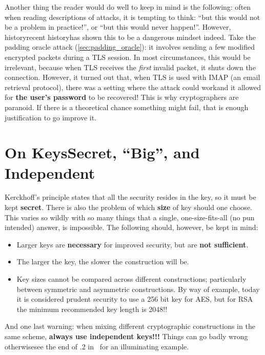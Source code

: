   \bigskip

   Another thing the reader would do well to keep in mind is the following: often when reading descriptions of attacks, it is tempting to think: ``but this would not be a problem in practice!'', or ``but this would never happen!''. However, history\emd recent history\emd has shown this to be a dangerous mindset indeed. Take the padding oracle attack (\ts\ref{sec:padding_oracle}): it involves sending a few modified encrypted packets during a TLS session. In most circumstances, this would be irrelevant, because when TLS receives the \emph{first} invalid packet, it shuts down the connection. However, it turned out that, when TLS is used with IMAP (an email retrieval protocol), there was a setting where the attack could work\emd and it allowed for \textbf{the user's password} to be recovered! This is why cryptographers are paranoid. If there is a theoretical chance something might fail, that is enough justification to go improve it.

\section{On Keys\emd Secret, ``Big'', and Independent}
  \label{sec:on_keys}
  Kerckhoff's principle states that all the security resides in the key, so it must be kept \textbf{secret}. There is also the problem of which \textbf{size} of key should one choose. This varies so wildly with so many things that a single, one-size-fits-all (no pun intended) answer, is impossible. The following should, however, be kept in mind:
  \begin{itemize}
    \item Larger keys are \textbf{necessary} for improved security, but are \textbf{not sufficient}.
    \item The larger the key, the slower the construction will be.
    \item Key sizes cannot be compared across different constructions; particularly between symmetric and asymmetric constructions. By way of example, today it is considered prudent security to use a 256 bit key for AES, but for RSA the minimum recommended key length is 2048!!
  \end{itemize}
  And one last warning: when mixing different cryptographic constructions in the same scheme, \textbf{always use independent keys!!!} Things can go badly wrong otherwise\emd see the end of .2 in~\cite{KatzLindell:IMC} for an illuminating example.


